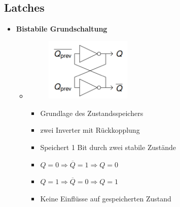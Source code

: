 \documentclass[11pt,a4paper]{article}
\begin{document}
\subsection{Latches}
\begin{itemize}

\item \textbf{Bistabile Grundschaltung}
	\begin{itemize}
	
	
	\item[]		
				\begin{minipage}{0.25\textwidth}
					\begin{figure}[H]
					\includegraphics[height=3cm]{bistabil}
					\end{figure}
				\end{minipage}
				\begin{minipage}[t]{0.6\textwidth}
					\vspace{-1.5cm}
					\begin{itemize}
					\item Grundlage des Zustandsspeichers
					\item zwei Inverter mit Rückkopplung
					\item Speichert 1 Bit durch zwei stabile Zustände
					\item $Q=0 \Rightarrow \overline{Q} =1 \Rightarrow Q=0$
					\item $Q=1 \Rightarrow \overline{Q} =0 \Rightarrow Q=1$
					\item Keine Einflüsse auf gespeicherten Zustand
					\end{itemize}
				\end{minipage}
	
	\end{itemize}
	

\end{itemize}
\end{document}
